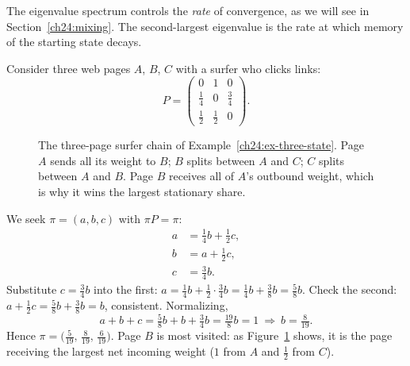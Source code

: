 The eigenvalue spectrum controls the \emph{rate} of
convergence, as we will see in Section~\ref{ch24:mixing}. The second-largest
eigenvalue is the rate at which memory of the starting state decays.
\begin{example}
\label{ch24:ex-three-state}
Consider three web pages $A$, $B$, $C$ with a surfer who clicks links:
\[
  P = \begin{pmatrix}
    0 & 1 & 0 \\
    \tfrac14 & 0 & \tfrac34 \\
    \tfrac12 & \tfrac12 & 0
  \end{pmatrix}.
\]
\begin{figure}[H]
  \centering
  \caption{The three-page surfer chain of Example~\ref{ch24:ex-three-state}.
  Page $A$ sends all its weight to $B$; $B$ splits between $A$ and $C$; $C$ splits
  between $A$ and $B$. Page $B$ receives all of $A$'s outbound weight, which is why it
  wins the largest stationary share.}
  \label{ch24:fig-three-state-diagram}
\end{figure}
We seek $\pi = (a,b,c)$ with $\pi P = \pi$:
\[
  \begin{aligned}
    a &= \tfrac14 b + \tfrac12 c, \\
    b &= a + \tfrac12 c, \\
    c &= \tfrac34 b.
  \end{aligned}
\]
Substitute $c = \tfrac34 b$ into the first: $a = \tfrac14 b + \tfrac12\cdot\tfrac34 b
= \tfrac14 b + \tfrac38 b = \tfrac58 b$. Check the second:
$a + \tfrac12 c = \tfrac58 b + \tfrac38 b = b$, consistent. Normalizing,
\[
  a + b + c = \tfrac58 b + b + \tfrac34 b = \tfrac{19}{8} b = 1
  \ \Rightarrow\ b = \tfrac{8}{19}.
\]
Hence $\pi = \bigl(\tfrac{5}{19},\,\tfrac{8}{19},\,\tfrac{6}{19}\bigr)$. Page $B$
is most visited: as Figure~\ref{ch24:fig-three-state-diagram} shows, it is the
page receiving the largest net incoming weight ($1$ from $A$ and $\tfrac12$ from $C$).
\end{example}
